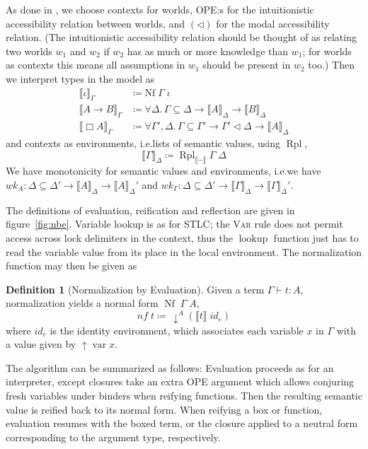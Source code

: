 \documentclass[12pt,twoside,openright]{report}
\numberwithin{equation}{chapter}
\numberwithin{figure}{chapter}
\numberwithin{table}{chapter}
\theoremstyle{definition}\newtheorem{definition}{Definition}
\begin{document}
As done in \cite{valliappan22}, we choose contexts for worlds,
OPE:s for the intuitionistic accessibility relation between worlds, and
$(\lhd)$ for the modal accessibility relation.
(The intuitionistic accessibility relation should be thought of as
relating two worlds $w_1$ and $w_2$ if $w_2$ has as much or more knowledge than $w_1$;
for worlds as contexts this means all assumptions in $w_1$ should be present in $w_2$ too.)
Then we interpret types in the model as
\begin{equation}\label{eq:sem-values}
  \begin{split}
  \llbracket \iota \rrbracket_\Gamma &\coloneqq \text{Nf} \; \Gamma \; \iota \\
  \llbracket A \to B \rrbracket_\Gamma &\coloneqq \forall \Delta. \, \Gamma \subseteq \Delta \to \llbracket A \rrbracket_\Delta \to \llbracket B \rrbracket_\Delta \\
  \llbracket \Box A \rrbracket_\Gamma &\coloneqq \forall \Gamma', \Delta. \, \Gamma \subseteq \Gamma' \to \Gamma'\lhd\Delta \to \llbracket A \rrbracket_\Delta
  \end{split}
\end{equation}
and contexts as environments, i.e.\@ lists of semantic values, using $\operatorname{Rpl}$,
$$ \llbracket \Gamma \rrbracket_\Delta \coloneqq \operatorname{Rpl}_{\llbracket-\rrbracket} \Gamma \; \Delta $$
We have monotonicity for semantic values and environments,
i.e.\@ we have
$wk_A : \Delta \subseteq \Delta' \to \llbracket A \rrbracket_\Delta \to \llbracket A \rrbracket_\Delta'$ and
$wk_\Gamma : \Delta \subseteq \Delta' \to \llbracket \Gamma \rrbracket_\Delta \to \llbracket \Gamma \rrbracket_\Delta'$.

The definitions of evaluation, reification and reflection are given in figure~\ref{fig:nbe}.
Variable lookup is as for STLC;
the \textsc{Var} rule does not permit access across lock delimiters in the context,
thus the $\operatorname{lookup}$ function just has to read
the variable value from its place in the local environment.
The normalization function may then be given as
\begin{definition}[Normalization by Evaluation]
  Given a term $\Gamma \vdash t : A$,
  normalization yields a normal form $\operatorname{Nf} \; \Gamma \; A$,
  $$ \textit{nf} \; t \coloneqq \, \downarrow^A (\llbracket t \rrbracket \; \textit{id}_e) $$
  where $\textit{id}_e$ is the identity environment,
  which associates each variable $x$ in $\Gamma$
  with a value given by $\uparrow \operatorname{var} x$.
\end{definition}
The algorithm can be summarized as follows:
Evaluation proceeds as for an interpreter,
except closures take an extra OPE argument
which allows conjuring fresh variables under binders when reifying functions.
Then the resulting semantic value is reified back to its normal form.
When reifying a box or function,
evaluation resumes with the boxed term,
or the closure applied to a neutral form corresponding to the argument type,
respectively.
\end{document}
